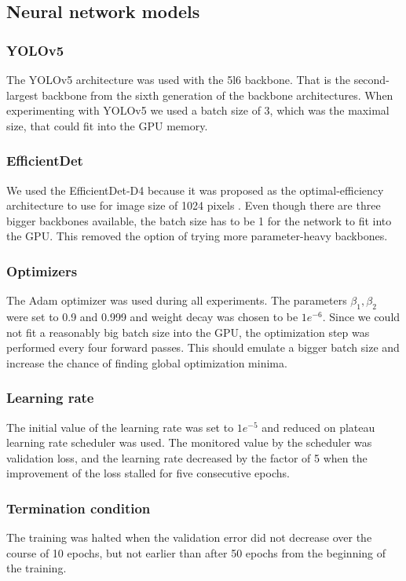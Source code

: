 \subsection{Neural network models}
\subsubsection{YOLOv5}
The YOLOv5 architecture was used with the 5l6 backbone. That is the second-largest backbone from the sixth generation of the backbone architectures. When experimenting with YOLOv5 we used a batch size of 3, which was the maximal size, that could fit into the GPU memory.
\subsubsection{EfficientDet}
We used the EfficientDet-D4 because it was proposed as the optimal-efficiency architecture to use for image size of 1024 pixels \cite{Tan2019}. Even though there are three bigger backbones available, the batch size has to be 1 for the network to fit into the GPU. This removed the option of trying more parameter-heavy backbones.

\subsubsection{Optimizers}
The Adam optimizer was used during all experiments. The parameters $\beta_1, \beta_2$ were set to 0.9 and 0.999 and weight decay was chosen to be $1e^{-6}$. Since we could not fit a reasonably big batch size into the GPU, the optimization step was performed every four forward passes. This should emulate a bigger batch size and increase the chance of finding global optimization minima.
\subsubsection{Learning rate}
The initial value of the learning rate was set to $1e^{-5}$ and reduced on plateau learning rate scheduler was used. The monitored value by the scheduler was validation loss, and the learning rate decreased by the factor of 5 when the improvement of the loss stalled for five consecutive epochs.
\subsubsection{Termination condition}
The training was halted when the validation error did not decrease over the course of 10 epochs, but not earlier than after 50 epochs from the beginning of the training.



